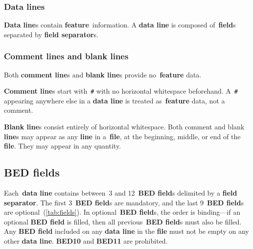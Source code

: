 \documentclass[11pt]{article}
\begin{document}
\subsubsection{Data lines}

\textbf{Data line}s contain \textbf{feature}~information.
A \textbf{data line} is composed of~\textbf{field}s separated by \textbf{field separator}s.

\subsubsection{Comment lines and blank lines}

Both \textbf{comment line}s and \textbf{blank line}s provide no~\textbf{feature} data.

\textbf{Comment line}s start with~\texttt{\#} with no horizontal whitespace beforehand.
A~\texttt{\#} appearing anywhere else in a \textbf{data line} is treated as~\textbf{feature} data, not a comment.

\textbf{Blank line}s consist entirely of horizontal whitespace.
Both comment and blank \textbf{line}s may appear as any \textbf{line} in a~\textbf{file}, at the beginning, middle, or end of the \textbf{file}.
They may appear in any quantity.

\subsection{\acs{BED} fields}

Each~\textbf{data line} contains between~3 and 12~\textbf{\acs{BED} field}s delimited by a \textbf{field separator}.
The first 3~\textbf{\acs{BED} field}s are mandatory, and the last 9~\textbf{\acs{BED} field}s are optional~(\autoref{tab:fields}).
In optional~\textbf{\acs{BED} field}s, the order is binding---if an optional \textbf{\acs{BED} field} is filled, then all previous~\textbf{\acs{BED} field}s must also be filled.
Any \textbf{\acs{BED} field} included on any \textbf{data line} in the \textbf{file} must not be empty on any other \textbf{data line}.
\textbf{BED10} and \textbf{BED11} are prohibited.
\end{document}
